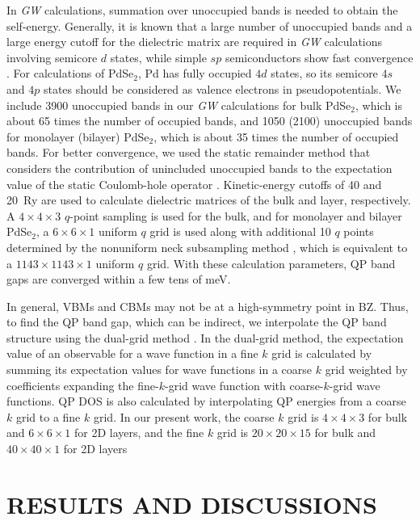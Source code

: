 \documentclass[aps,prb,longbibliography,twocolumn]{revtex4-2}
\begin{document}
In {\em GW} calculations, summation over unoccupied bands is needed to obtain
the self-energy. 
Generally, it is known that a large number of unoccupied bands and 
a large energy cutoff for the dielectric matrix are required in {\em GW} 
calculations involving semicore $d$ states, 
while simple $sp$ semiconductors show fast convergence \cite{Shih2010}. 
For calculations of PdSe$_2$, Pd has fully occupied $4d$ states, 
so its semicore $4s$ and $4p$ states should be considered as valence electrons in pseudopotentials.
We include 3900 unoccupied bands in our {\em GW} calculations for bulk PdSe$_2$,
which is about 65 times the number of occupied bands,
and 1050 (2100) unoccupied bands for monolayer (bilayer)
PdSe$_2$, which is about 35 times the number of occupied bands.
For better convergence, we used the static remainder method that 
considers the contribution of unincluded unoccupied bands to the expectation value 
of the static Coulomb-hole operator \cite{Deslippe2013}.
Kinetic-energy cutoffs of 40 and 20~Ry are used to calculate dielectric 
matrices of the bulk and layer, respectively. 
A $4{\times}4{\times}3$ $q$-point sampling is used for the bulk, and for monolayer 
and bilayer PdSe$_2$, a $6{\times}6{\times}1$ uniform $q$ grid is used along 
with additional 10 $q$ points determined by the nonuniform neck subsampling
method \cite{Jornada2017}, which is equivalent to 
a $1143{\times}1143{\times}1$ uniform $q$ grid. 
With these calculation parameters, QP band gaps are converged within a few tens 
of meV.


In general, VBMs and CBMs may not be at a high-symmetry point in BZ.
Thus, to find the QP band gap, which can be indirect, we interpolate 
the QP band structure using the dual-grid method \cite{Rohlfing2000}.
In the dual-grid method, the expectation value of an observable for a wave function in a fine $k$ grid is 
calculated by summing its expectation values for wave functions in a coarse $k$ grid
weighted by coefficients expanding the fine-$k$-grid wave function with 
coarse-$k$-grid wave functions.
QP DOS is also calculated by interpolating 
QP energies from a coarse $k$ grid to a fine $k$ grid.
In our present work, the coarse $k$ grid is $4{\times}4{\times}3$ for bulk and $6{\times}6{\times}1$ for 2D layers, and the fine $k$ grid is
$20{\times}20{\times}15$ for bulk and $40{\times}40{\times}1$ for 2D layers








\section{\label{sec3pdse2}RESULTS AND DISCUSSIONS}
\end{document}
